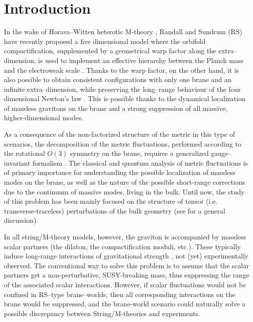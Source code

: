 \documentclass[a4paper,12pt]{article}
\begin{document}
\section{Introduction}

In the wake of Horava--Witten heterotic M-theory \cite{HW},
Randall and Sundrum (RS) have recently proposed a five dimensional
model where the orbifold compactification, supplemented by a
geometrical warp factor along the extra--dimension, is used to
implement an effective hierarchy between the Planck mass and
the electroweak scale \cite{RS1}. Thanks to the warp factor, on the
other hand, it is also possible to obtain consistent configurations with
only one brane and an infinite extra--dimension, while preserving the
long--range behaviour of the four dimensional Newton's law \cite{RS2}.
This is possible thanks to the dynamical localization of massless
gravitons on the brane and a strong suppression of all massive,
higher-dimensional modes.

As a consequence of the non-factorized structure of the metric in this
type of scenarios, the decomposition of the metric fluctuations,
performed according to the rotational $O(3)$ symmetry on the brane,
requires a generalized gauge--invariant formalism \cite{BDBL}. The
classical and quantum analysis of metric fluctuations is of primary
importance for understanding the possible localization of massless
modes on the brane, as well as the nature of the possible
short-range corrections  due to the continuum of massive modes, living
in the bulk. Until now, the study of this problem has been mainly
focused on the structure of tensor (i.e. transverse-traceless)
perturbations of the bulk geometry (see \cite{CEHS} for a general
discussion).

In all string/M-theory models, however, the graviton is
accompanied by massless scalar partners (the dilaton, the
compactification moduli, etc.). These typically induce long-range
interactions of gravitational strength \cite{TV}, not (yet)
experimentally observed. The conventional  way to solve this problem
is to assume that the scalar partners get a non-perturbative,
SUSY-breaking mass, thus suppressing the range of the associated
scalar interactions. However, if scalar fluctuations would not be
confined in RS--type brane--worlds, then all corresponding interactions
on the brane would be suppressed,  and the brane-world scenario could
naturally solve a possible discrepancy between String/M-theories and
experiments.
\end{document}
